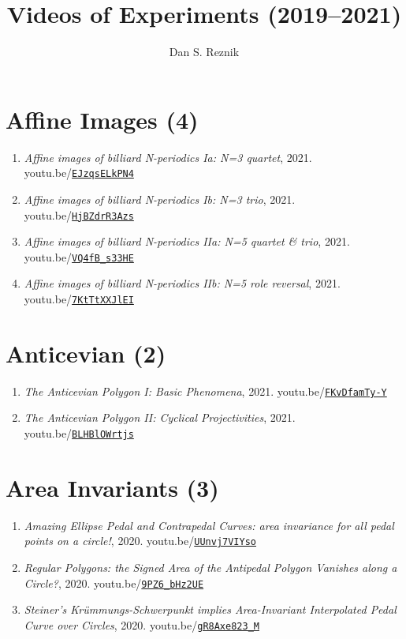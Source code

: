 \documentclass[12pt]{article}
\title{Videos of Experiments (2019--2021)}
\author{Dan S. Reznik}
\begin{document}
\maketitle

\tableofcontents\section{Affine Images (4)}

\begin{enumerate}[resume]
\item \textit{Affine images of billiard N-periodics Ia: N=3 quartet}, 2021. youtu.be/\href{https://youtu.be/EJzqsELkPN4}{\nolinkurl{EJzqsELkPN4}}
\item \textit{Affine images of billiard N-periodics Ib: N=3 trio}, 2021. youtu.be/\href{https://youtu.be/HjBZdrR3Azs}{\nolinkurl{HjBZdrR3Azs}}
\item \textit{Affine images of billiard N-periodics IIa: N=5 quartet \& trio}, 2021. youtu.be/\href{https://youtu.be/VQ4fB_s33HE}{\nolinkurl{VQ4fB\_s33HE}}
\item \textit{Affine images of billiard N-periodics IIb: N=5 role reversal}, 2021. youtu.be/\href{https://youtu.be/7KtTtXXJlEI}{\nolinkurl{7KtTtXXJlEI}}
\end{enumerate}

\section{Anticevian (2)}

\begin{enumerate}[resume]
\item \textit{The Anticevian Polygon I: Basic Phenomena}, 2021. youtu.be/\href{https://youtu.be/FKvDfamTy-Y}{\nolinkurl{FKvDfamTy-Y}}
\item \textit{The Anticevian Polygon II: Cyclical Projectivities}, 2021. youtu.be/\href{https://youtu.be/BLHBlOWrtjs}{\nolinkurl{BLHBlOWrtjs}}
\end{enumerate}

\section{Area Invariants (3)}

\begin{enumerate}[resume]
\item \textit{Amazing Ellipse Pedal and Contrapedal Curves: area invariance for all pedal points on a circle!}, 2020. youtu.be/\href{https://youtu.be/UUnvj7VIYso}{\nolinkurl{UUnvj7VIYso}}
\item \textit{Regular Polygons: the Signed Area of the Antipedal Polygon Vanishes along a Circle?}, 2020. youtu.be/\href{https://youtu.be/9PZ6_bHz2UE}{\nolinkurl{9PZ6\_bHz2UE}}
\item \textit{Steiner's Krümmungs-Schwerpunkt implies Area-Invariant Interpolated Pedal Curve over Circles}, 2020. youtu.be/\href{https://youtu.be/gR8Axe823_M}{\nolinkurl{gR8Axe823\_M}}
\end{enumerate}
\end{document}
